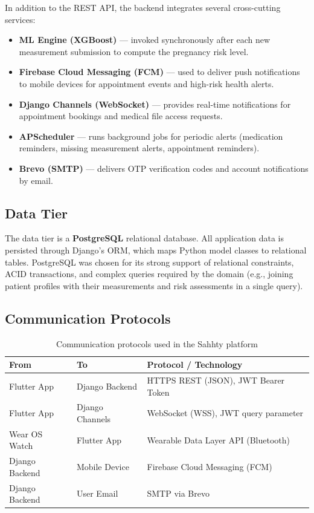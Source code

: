 In addition to the REST API, the backend integrates several cross-cutting services:
\begin{itemize}
    \item \textbf{ML Engine (XGBoost)} — invoked synchronously after each new measurement submission to compute the pregnancy risk level.
    \item \textbf{Firebase Cloud Messaging (FCM)} — used to deliver push notifications to mobile devices for appointment events and high-risk health alerts.
    \item \textbf{Django Channels (WebSocket)} — provides real-time notifications for appointment bookings and medical file access requests.
    \item \textbf{APScheduler} — runs background jobs for periodic alerts (medication reminders, missing measurement alerts, appointment reminders).
    \item \textbf{Brevo (SMTP)} — delivers OTP verification codes and account notifications by email.
\end{itemize}

\subsection{Data Tier}

The data tier is a \textbf{PostgreSQL} relational database. All application data is persisted through Django's ORM, which maps Python model classes to relational tables. PostgreSQL was chosen for its strong support of relational constraints, ACID transactions, and complex queries required by the domain (e.g., joining patient profiles with their measurements and risk assessments in a single query).

\subsection{Communication Protocols}

\begin{table}[H]
\centering
\caption{Communication protocols used in the Sahhty platform}
\renewcommand{\arraystretch}{1.3}
\begin{tabular}{|p{4cm}|p{4cm}|p{5.5cm}|}
\hline
\textbf{From} & \textbf{To} & \textbf{Protocol / Technology} \\
\hline
Flutter App & Django Backend & HTTPS REST (JSON), JWT Bearer Token \\
\hline
Flutter App & Django Channels & WebSocket (WSS), JWT query parameter \\
\hline
Wear OS Watch & Flutter App & Wearable Data Layer API (Bluetooth) \\
\hline
Django Backend & Mobile Device & Firebase Cloud Messaging (FCM) \\
\hline
Django Backend & User Email & SMTP via Brevo \\
\hline
\end{tabular}
\end{table}

